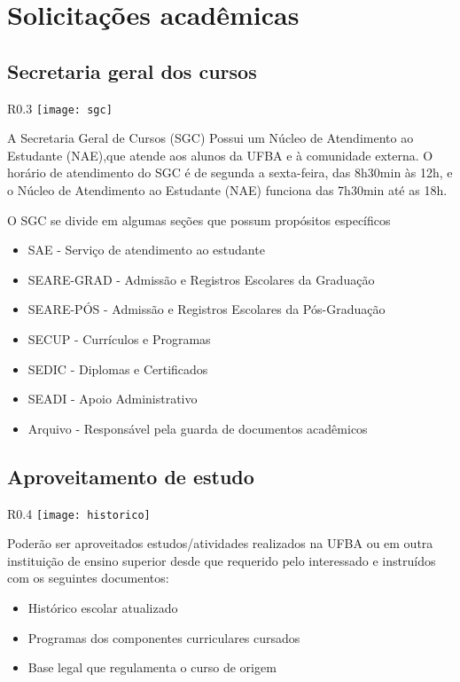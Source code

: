 \chapter{Solicitações acadêmicas}
	\section{Secretaria geral dos cursos}
	   \begin{wrapfigure}{R}{0.3\textwidth}
            \centering
            \texttt{[image: sgc]}
        \end{wrapfigure}
            
A Secretaria Geral de Cursos (SGC) Possui um Núcleo de Atendimento ao Estudante (NAE),que atende aos alunos da UFBA e à comunidade externa. O horário de atendimento do SGC é de segunda a sexta-feira, das 8h30min às 12h, e o Núcleo de Atendimento ao Estudante (NAE) funciona das 7h30min até as 18h.
               
O SGC se divide em algumas seções que possum propósitos específicos

\begin{itemize}
    \item SAE - Serviço de atendimento ao estudante
    \item SEARE-GRAD - Admissão e Registros Escolares da Graduação
    \item SEARE-PÓS - Admissão e Registros Escolares da Pós-Graduação
    \item SECUP - Currículos e Programas
    \item SEDIC - Diplomas e Certificados
    \item SEADI - Apoio Administrativo
    \item Arquivo - Responsável pela guarda de documentos acadêmicos
\end{itemize}


\section{Aproveitamento de estudo}
     \begin{wrapfigure}{R}{0.4\textwidth}
            \centering
            \texttt{[image: historico]}
        \end{wrapfigure}
            Poderão ser aproveitados estudos/atividades realizados na UFBA ou em outra instituição de ensino superior desde que requerido pelo interessado e instruídos com os seguintes documentos:
          \begin{itemize}
              \item Histórico escolar atualizado
                    \item Programas dos componentes curriculares cursados
                    \item Base legal que regulamenta o curso de origem
                \end{itemize}

